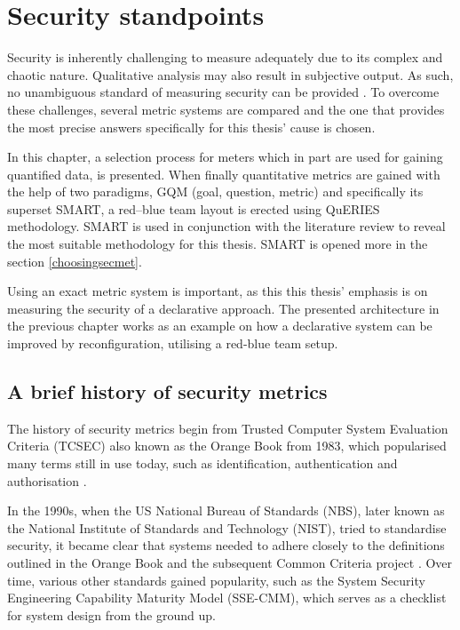 \chapter{Security standpoints} \label{securitystandpoints}

Security is inherently challenging to measure adequately due to its
complex and chaotic nature. Qualitative analysis may also result in
subjective output. As such, no unambiguous standard of measuring
security can be provided \cite{wang2005information}. To overcome these
challenges, several metric systems are compared and the one that
provides the most precise answers specifically for this thesis' cause
is chosen.

In this chapter, a selection process for meters which in part are used
for gaining quantified data, is presented.  When finally quantitative
metrics are gained with the help of two paradigms, GQM (goal, question, metric) and
specifically its superset SMART, a red–blue team layout is erected
using QuERIES methodology. SMART is used in conjunction with the
literature review to reveal the most suitable methodology for this
thesis. SMART is opened more in the section \ref{choosingsecmet}.

Using an exact metric system is important, as this this thesis'
emphasis is on measuring the security of a declarative approach. The
presented architecture in the previous chapter works as an example on
how a declarative system can be improved by reconfiguration, utilising
a red-blue team setup.

\section{A brief history of security metrics}

The history of security metrics begin from Trusted Computer System
Evaluation Criteria (TCSEC) also known as the Orange Book from 1983,
which popularised many terms still in use today, such as
identification, authentication and
authorisation \cite{bayuk2013measuring}.

In the 1990s, when the US National Bureau of Standards (NBS), later
known as the National Institute of Standards and Technology (NIST),
tried to standardise security, it became clear that systems needed to
adhere closely to the definitions outlined in the Orange Book and the
subsequent Common Criteria project \cite{bayuk2013measuring}. Over time, various other standards
gained popularity, such as the System Security Engineering Capability
Maturity Model (SSE-CMM), which serves as a checklist for system
design from the ground up. 

